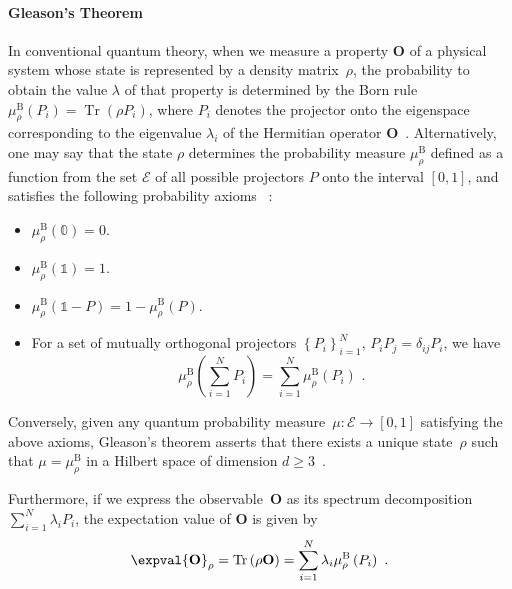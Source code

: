 \documentclass[english,reprint, aps, prl,superscriptaddress, showpacs,
showkeys, longbibliography, amsmath, amssymb]{revtex4-1}
\theoremstyle{plain}
\theoremstyle{definition}
\newcommand{\events}{\ensuremath{\mathcal{E}}}
\newcommand{\Tr}{\mathop{\mathrm{Tr}}\nolimits}
\begin{document}
\paragraph{Gleason's Theorem}

In conventional quantum theory, when we measure a property $\mathbf{O}$
of a physical system whose state is represented by a density matrix~$\rho$,
the probability to obtain the value $\lambda$ of that property is
determined by the Born rule $\mu_{\rho}^{\mathrm{B}}\left(P_{i}\right)=\Tr\left(\rho P_{i}\right)$,
where $P_{i}$ denotes the projector onto the eigenspace corresponding
to the eigenvalue $\lambda_{i}$ of the Hermitian operator $\mathbf{O}$~\cite{Born1983,peres1995quantum,544199,Jaeger2007}.
Alternatively, one may say that the state $\rho$ determines the probability
measure $\mu_{\rho}^{\mathrm{B}}$ defined as a function from the
set $\events$ of all possible projectors $P$ onto the interval $[0,1]$,
and satisfies the following probability axioms~ \cite{10.2307/2308516,gleason1957,Redhead1987-REDINA,Maassen2010}: 
\begin{itemize}
\item $\mu_{\rho}^{\mathrm{B}}(\mathbb{0})=0$. 
\item $\mu_{\rho}^{\mathrm{B}}(\mathbb{1})=1$. 
\item $\mu_{\rho}^{\mathrm{B}}\left(\mathbb{1}-P\right)=
1-\mu_{\rho}^{\mathrm{B}}\left(P\right)$. 
\item For a set of mutually orthogonal projectors $\left\{ P_{i}\right\} _{i=1}^{N}$,
$P_iP_j=\delta_{ij}P_i$,
we have 
\begin{equation}
\mu_{\rho}^{\mathrm{B}}\left(\sum_{i=1}^{N}P_{i}\right)=
\sum_{i=1}^{N}\mu_{\rho}^{\mathrm{B}}\left(P_{i}\right)
\textrm{ .}\label{eq:QuantumProbability-Addition}
\end{equation}
\end{itemize}
Conversely, given any quantum probability measure~$\mu:\events\rightarrow[0,1]$
satisfying the above axioms, Gleason's theorem asserts that there
exists a unique state~$\rho$ such that $\mu=\mu_{\rho}^{\mathrm{B}}$
in a Hilbert space of dimension $d\geq3$~\cite{gleason1957,Redhead1987-REDINA,peres1995quantum}.

Furthermore, if we express the observable~$\mathbf{O}$ as its spectrum
decomposition~$\sum_{i=1}^{N}\lambda_{i}P_{i}$, the expectation
value of $\mathbf{O}$ is given by~\cite{544199,Jaeger2007}
\begin{equation}
\expval{\mathbf{O}}_{\rho}=\Tr\left(\rho\mathbf{O}\right)=\sum_{i=1}^{N}\lambda_{i}\mu_{\rho}^{\mathrm{B}}\left(P_{i}\right)\ .\label{eq:quantum-expectation}
\end{equation}
\end{document}
